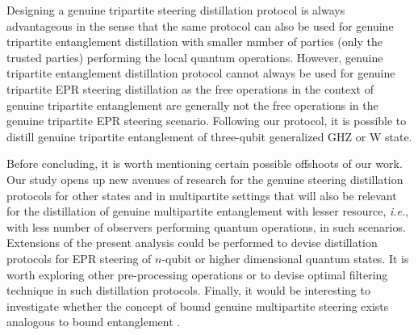 \documentclass[reprint,superscriptaddress,nofootinbib,amsmath,amssymb,aps,pra,longbibliography]{revtex4-1}
\begin{document}
Designing a genuine tripartite steering distillation protocol is always advantageous in the sense that the same protocol can also be used for genuine tripartite entanglement distillation with smaller number of parties (only the trusted parties)  performing the local quantum operations. However, genuine tripartite entanglement distillation protocol cannot always be used for genuine tripartite EPR steering distillation as the free operations in the context of genuine tripartite entanglement are generally not the free operations in the genuine tripartite EPR steering scenario. Following our protocol, it is possible to distill genuine tripartite entanglement of three-qubit generalized GHZ or W state. 

Before concluding, it is worth mentioning certain possible offshoots of our work. Our study opens up new avenues of research for the genuine steering distillation protocols for other states and in multipartite settings that will also be relevant for the distillation of genuine multipartite entanglement with lesser resource, {\it i.e.}, with less number of observers performing quantum operations, in such scenarios. Extensions of the present analysis could be performed to devise distillation protocols  for EPR steering of $n$-qubit or higher dimensional quantum states. It is worth exploring other pre-processing operations or to devise optimal filtering technique in such distillation protocols. Finally, it would be interesting to investigate whether  the concept of  bound genuine multipartite steering exists analogous to bound entanglement \cite{Horo98}. \\
  
\end{document}
